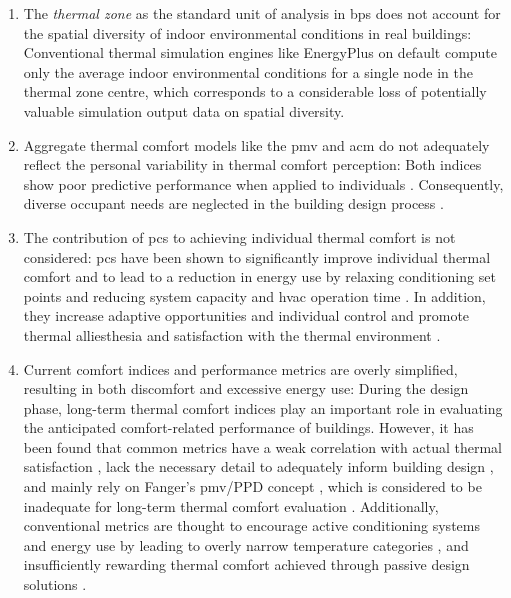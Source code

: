 \begin{enumerate}[label={(\alph*)}]

    \item  The \textit{thermal zone} as the standard unit of analysis in \gls{bps} does not account for the spatial diversity of indoor environmental conditions in real buildings: Conventional thermal simulation engines like EnergyPlus \citep{CrawleyEnergyPlus2001} on default compute only the average indoor environmental conditions for a single node in the thermal zone centre, which corresponds to a considerable loss of potentially valuable simulation output data on spatial diversity.

    \item Aggregate thermal comfort models like the \gls{pmv} and \gls{acm} do not adequately reflect the personal variability in thermal comfort perception: Both indices show poor predictive performance when applied to individuals \citep{Cheung2019, VanHoof2008, KimZhou2018, Gauthier2020, Du2022}. Consequently, diverse occupant needs are neglected in the building design process \citep{Azar2020}.

    \item The contribution of \gls{pcs} to achieving individual thermal comfort is not considered: \gls{pcs} have been shown to significantly improve individual thermal comfort \citep{Kim2019, Knudsen2023} and to lead to a reduction in energy use by relaxing conditioning set points and reducing system capacity and \gls{hvac} operation time \citep{Rawal2020, Zhang2022}. In addition, they increase adaptive opportunities and individual control \citep{KimSchiavon2018} and promote thermal alliesthesia \citep{He2022} and satisfaction with the thermal environment \citep{Zhang2018, Kim2019}.

    \item Current comfort indices and performance metrics are overly simplified, resulting in both discomfort and excessive energy use: During the design phase, long-term thermal comfort indices play an important role in evaluating the anticipated comfort-related performance of buildings. However, it has been found that common metrics have a weak correlation with actual thermal satisfaction \citep{Li2020}, lack the necessary detail to adequately inform building design \citep{Carlucci2012}, and mainly rely on Fanger's \gls{pmv}/PPD concept \citep{Carlucci2012}, which is considered to be inadequate for long-term thermal comfort evaluation \citep{Humphreys2002, Cheung2019, Carlucci2012, Li2020}. Additionally, conventional metrics are thought to encourage active conditioning systems and energy use by leading to overly narrow temperature categories \citep{Arens2010, Hoyt2015}, and insufficiently rewarding thermal comfort achieved through passive design solutions \citep{Nicol2009}.

\end{enumerate}


